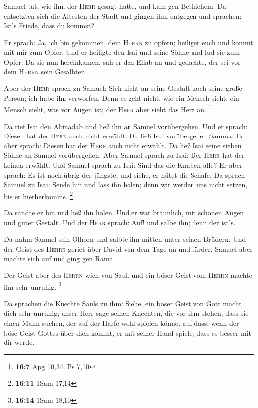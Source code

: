  Samuel tat, wie ihm der \textsc{Herr} gesagt hatte, und
kam gen Bethlehem. Da entsetzten sich die Ältesten der Stadt und gingen
ihm entgegen und sprachen: Ist's Friede, dass du kommst?

 Er sprach: Ja, ich bin gekommen, dem \textsc{Herrn} zu
opfern; heiliget euch und kommt mit mir zum Opfer. Und er heiligte den
Isai und seine Söhne und lud sie zum Opfer.  Da sie nun
hereinkamen, sah er den Eliab an und gedachte, der sei vor dem
\textsc{Herrn} sein Gesalbter.

 Aber der \textsc{Herr} sprach zu Samuel: Sieh nicht an
seine Gestalt noch seine große Person; ich habe ihn verworfen. Denn es
geht nicht, wie ein Mensch sieht: ein Mensch sieht, was vor Augen ist;
der \textsc{Herr} aber sieht das Herz an. \footnote{\textbf{16:7} Apg
  10,34; Ps 7,10}

 Da rief Isai den Abinadab und ließ ihn an Samuel
vorübergehen. Und er sprach: Diesen hat der \textsc{Herr} auch nicht
erwählt.  Da ließ Isai vorübergehen Samma. Er aber sprach:
Diesen hat der \textsc{Herr} auch nicht erwählt.  Da ließ
Isai seine sieben Söhne an Samuel vorübergehen. Aber Samuel sprach zu
Isai: Der \textsc{Herr} hat der keinen erwählt.  Und
Samuel sprach zu Isai: Sind das die Knaben alle? Er aber sprach: Es ist
noch übrig der jüngste; und siehe, er hütet die Schafe. Da sprach Samuel
zu Isai: Sende hin und lass ihn holen; denn wir werden uns nicht setzen,
bis er hierherkomme. \footnote{\textbf{16:11} 1Sam 17,14}

 Da sandte er hin und ließ ihn holen. Und er war
bräunlich, mit schönen Augen und guter Gestalt. Und der \textsc{Herr}
sprach: Auf! und salbe ihn; denn der ist's.

 Da nahm Samuel sein Ölhorn und salbte ihn mitten unter
seinen Brüdern. Und der Geist des \textsc{Herrn} geriet über David von
dem Tage an und fürder. Samuel aber machte sich auf und ging gen Rama.

 Der Geist aber des \textsc{Herrn} wich von Saul, und ein
böser Geist vom \textsc{Herrn} machte ihn sehr unruhig. \footnote{\textbf{16:14}
  1Sam 18,10}

 Da sprachen die Knechte Sauls zu ihm: Siehe, ein böser
Geist von Gott macht dich sehr unruhig;  unser Herr sage
seinen Knechten, die vor ihm stehen, dass sie einen Mann suchen, der auf
der Harfe wohl spielen könne, auf dass, wenn der böse Geist Gottes über
dich kommt, er mit seiner Hand spiele, dass es besser mit dir werde.


